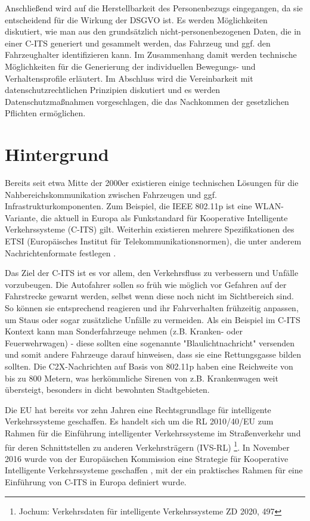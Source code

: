 Anschließend wird auf die Herstellbarkeit des Personenbezugs eingegangen, da sie entscheidend für die Wirkung der DSGVO ist. Es werden Möglichkeiten diskutiert, wie man aus den grundsätzlich nicht-personenbezogenen Daten, die in einer C-ITS generiert und gesammelt werden, das Fahrzeug und ggf. den Fahrzeughalter identifizieren kann. Im Zusammenhang damit werden technische Möglichkeiten für die Generierung der individuellen Bewegungs- und Verhaltensprofile erläutert. Im Abschluss wird die Vereinbarkeit mit datenschutzrechtlichen Prinzipien diskutiert und es werden Datenschutzmaßnahmen vorgeschlagen, die das Nachkommen der gesetzlichen Pflichten ermöglichen.


\section{Hintergrund}
\label{ch:Citation}

Bereits seit etwa Mitte der 2000er existieren einige technischen Lösungen für die Nahbereichskommunikation zwischen Fahrzeugen und ggf. Infrastrukturkomponenten. Zum Beispiel, die IEEE 802.11p ist eine WLAN-Variante, die aktuell in Europa als Funkstandard für Kooperative Intelligente Verkehrssysteme (C-ITS) gilt. Weiterhin existieren mehrere Spezifikationen des ETSI (Europäisches Institut für Telekommunikationsnormen), die unter anderem Nachrichtenformate festlegen \cite{Strubbe2017}. 

Das Ziel der C-ITS ist es vor allem, den Verkehrsfluss zu verbessern und Unfälle vorzubeugen. Die Autofahrer sollen so früh wie möglich vor Gefahren auf der Fahrstrecke gewarnt werden, selbst wenn diese noch nicht im Sichtbereich sind. So können sie entsprechend reagieren und ihr Fahrverhalten frühzeitig anpassen, um Staus oder sogar zusätzliche Unfälle zu vermeiden. Als ein Beispiel im C-ITS Kontext kann man Sonderfahrzeuge nehmen (z.B. Kranken- oder Feuerwehrwagen) - diese sollten eine sogenannte "Blaulichtnachricht" versenden und somit andere Fahrzeuge darauf hinweisen, dass sie eine Rettungsgasse bilden sollten. Die C2X-Nachrichten auf Basis von 802.11p haben eine Reichweite von bis zu 800 Metern, was herkömmliche Sirenen von z.B. Krankenwagen weit übersteigt, besonders in dicht bewohnten Stadtgebieten.

Die EU hat bereits vor zehn Jahren eine Rechtsgrundlage für intelligente Verkehrssysteme geschaffen. Es handelt sich um die RL 2010/40/EU zum Rahmen für die Einführung intelligenter Verkehrssysteme im Straßenverkehr und für deren Schnittstellen zu anderen Verkehrsträgern (IVS-RL) \footnote{Jochum: Verkehrsdaten für intelligente Verkehrssysteme ZD 2020, 497}. In November 2016 wurde von der Europäischen Kommission eine Strategie für Kooperative Intelligente Verkehrssysteme geschaffen \cite{CITS2016}, mit der ein praktisches Rahmen für eine Einführung von C-ITS in Europa definiert wurde. 

